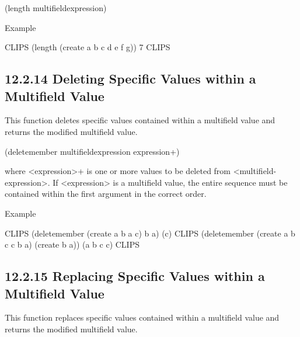 \documentclass[letterpaper,10pt,english]{sphinxmanual}
\begin{document}

\begin{sphinxVerbatim}[commandchars=\\\{\}]
(length\PYGZdl{} \PYGZlt{}multifield\PYGZhy{}expression\PYGZgt{})
\end{sphinxVerbatim}

Example

\begin{sphinxVerbatim}[commandchars=\\\{\}]
CLIPS\PYGZgt{} (length\PYGZdl{} (create\PYGZdl{} a b c d e f g))
7
CLIPS\PYGZgt{}
\end{sphinxVerbatim}


\subsection{12.2.14 Deleting Specific Values within a Multifield Value}
\label{\detokenize{actions:deleting-specific-values-within-a-multifield-value}}
This function deletes specific values contained within a multifield
value and returns the modified multifield value.


\begin{sphinxVerbatim}[commandchars=\\\{\}]
(delete\PYGZhy{}member\PYGZdl{} \PYGZlt{}multifield\PYGZhy{}expression\PYGZgt{} \PYGZlt{}expression\PYGZgt{}+)
\end{sphinxVerbatim}

where \textless{}expression\textgreater{}+ is one or more values to be deleted from
\textless{}multifield-expression\textgreater{}. If \textless{}expression\textgreater{} is a multifield value, the
entire sequence must be contained within the first argument in the
correct order.

Example

\begin{sphinxVerbatim}[commandchars=\\\{\}]
CLIPS\PYGZgt{} (delete\PYGZhy{}member\PYGZdl{} (create\PYGZdl{} a b a c) b a)
(c)
CLIPS\PYGZgt{} (delete\PYGZhy{}member\PYGZdl{} (create\PYGZdl{} a b c c b a) (create\PYGZdl{} b a))
(a b c c)
CLIPS\PYGZgt{}
\end{sphinxVerbatim}


\subsection{12.2.15 Replacing Specific Values within a Multifield Value}
\label{\detokenize{actions:replacing-specific-values-within-a-multifield-value}}
This function replaces specific values contained within a multifield
value and returns the modified multifield value.
\end{document}
